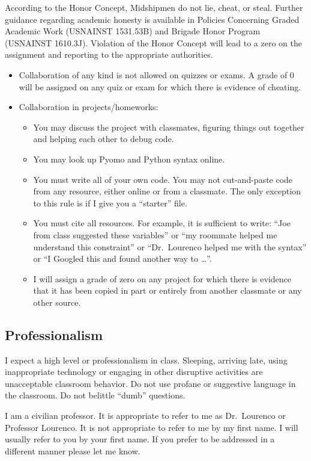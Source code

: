 \documentclass[letterpaper,hidelinks,oneside,11pt]{article}%
\begin{document}
According to the Honor Concept, Midshipmen do not lie, cheat, or steal. Further guidance regarding academic honesty is available in Policies Concerning Graded Academic Work (USNAINST 1531.53B) and Brigade Honor Program (USNAINST 1610.3J). Violation of the Honor Concept will lead to a zero on the assignment and reporting to the appropriate authorities. 
\begin{itemize}
	\item Collaboration of any kind is not allowed on quizzes or exams. A grade of 0 will be assigned on any quiz or exam for which there is evidence of cheating.
	\item Collaboration in projects/homeworks:
	\begin{itemize}
	\item You may discuss the project with classmates, figuring things out together and helping each other to debug code.
	\item You may look up Pyomo and Python syntax online.
	\item You must write all of your own code. You may not cut-and-paste code from any resource, either online or from a classmate. The only exception to this rule is if I give you a ``starter'' file.
	\item You must cite all resources. For example, it is sufficient to write: “Joe from class suggested these variables” or “my roommate helped me understand this constraint” or “Dr.\ Lourenco helped me with the syntax” or “I Googled this and found another way to …”.
	\item I will assign a grade of zero on any project for which there is evidence that it has been copied in part or entirely from another classmate or any other source.
	\end{itemize}
\end{itemize}

\subsection*{Professionalism}
I expect a high level or professionalism in class. Sleeping, arriving late, using inappropriate technology or engaging in other disruptive activities are unacceptable classroom behavior. Do not use profane or suggestive language in the classroom. Do not belittle ``dumb'' questions.

I am a civilian professor. It is appropriate to refer to me as Dr.\ Lourenco or Professor Lourenco. It is not appropriate to refer to me by my first name. I will usually refer to you by your first name. If you prefer to be addressed in a different manner please let me know.
\end{document}
